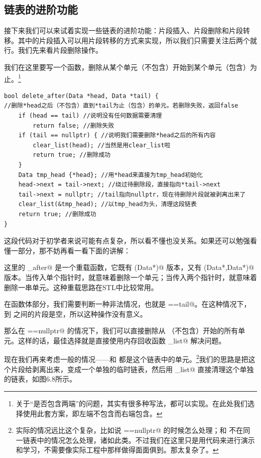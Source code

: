 \subsection*{链表的进阶功能}
接下来我们可以来试着实现一些链表的进阶功能：片段插入、片段删除和片段转移。其中的片段插入可以用片段转移的方式来实现，所以我们只需要关注后两个就行。我们先来看片段删除操作。\par
我们在这里要写一个函数，删除从某个单元（不包含）开始到某个单元（包含）为止。\footnote{关于``是否包含两端''的问题，其实有很多种写法，都可以实现。在此处我们选择使用此套方案，即左端不包含而右端包含。}
\begin{lstlisting}
bool delete_after(Data *head, Data *tail) {
//删除*head之后（不包含）直到*tail为止（包含）的单元。若删除失败，返回false
    if (head == tail) //说明没有任何数据需要清理
        return false; //删除失败
    if (tail == nullptr) { //说明我们需要删除*head之后的所有内容
        clear_list(head); //当然是用clear_list啦
        return true; //删除成功
    }
    Data tmp_head {*head}; //用*head来直接为tmp_head初始化
    head->next = tail->next; //绕过待删除段，直接指向*tail->next
    tail->next = nullptr; //tail指向nullptr，现在待删除片段就被剥离出来了
    clear_list(&tmp_head); //以tmp_head为头，清理这段链表
    return true; //删除成功
}
\end{lstlisting}
这段代码对于初学者来说可能有点复杂，所以看不懂也没关系。如果还可以勉强看懂一部分，那不妨再看一看下面的讲解：\par
这里的 \lstinline@delete_after@ 是一个重载函数，它既有 \lstinline@(Data*)@ 版本，又有 \lstinline@(Data*,Data*)@ 版本。当传入单个指针时，就意味着删除一个单元；当传入两个指针时，就意味着删除一串单元。这种重载思路在STL中比较常用。\par
在函数体部分，我们需要判断一种非法情况，也就是 \lstinline@head==tail@。在这种情况下，\lstinline@head@ 到 \lstinline@tail@ 之间的片段是空，所以这种操作没有意义。\par
那么在 \lstinline@tail==nullptr@ 的情况下，我们可以直接删除从 \lstinline@head@（不包含）开始的所有单元。这样的话，最佳选择就是直接使用内存回收函数 \lstinline@clear_list@ 解决问题。\par
现在我们再来考虑一般的情况——\lstinline@head@ 和 \lstinline@tail@ 都是这个链表中的单元。\footnote{实际的情况远比这个复杂，比如说 \lstinline@head==nullptr@ 的时候怎么处理；\lstinline@head@ 和 \lstinline@tail@ 不在同一链表中的情况怎么处理，诸如此类。不过我们在这里只是用代码来进行演示和学习，不需要像实际工程中那样做得面面俱到。那太复杂了。}我们的思路是把这个片段给剥离出来，变成一个单独的临时链表，然后用 \lstinline@clear_list@ 直接清理这个单独的链表，如图6.8所示。\par
